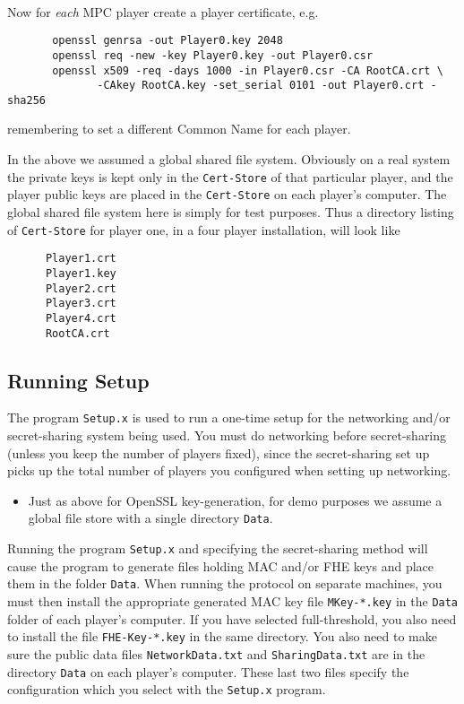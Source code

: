 ~~

\noindent
Now for {\em each} MPC player create a player certificate, e.g.
\begin{verbatim}
       openssl genrsa -out Player0.key 2048
       openssl req -new -key Player0.key -out Player0.csr
       openssl x509 -req -days 1000 -in Player0.csr -CA RootCA.crt \
              -CAkey RootCA.key -set_serial 0101 -out Player0.crt -sha256
\end{verbatim}
remembering to set a different Common Name for each player.

In the above we assumed a global shared file system.  Obviously on
a real system the private keys is kept only in the
\verb+Cert-Store+ of that particular player, and the player public
keys are placed in the \verb+Cert-Store+ on each player's
computer. The global shared file system here is simply for test
purposes. Thus a directory listing of \verb+Cert-Store+
for player one, in a four player installation, will look like
\begin{verbatim}
      Player1.crt
      Player1.key
      Player2.crt
      Player3.crt
      Player4.crt
      RootCA.crt
\end{verbatim}


\subsection{Running Setup}
The program \verb+Setup.x+ is used to run a one-time setup 
for the networking and/or secret-sharing system being used.
You must do networking before secret-sharing (unless you keep
the number of players fixed), since the secret-sharing set up
picks up the total number of players you configured when setting
up networking.
\begin{itemize}
\item Just as above for OpenSSL key-generation, for demo purposes we assume
a global file store with a single directory \verb+Data+.
\end{itemize}
Running the program \verb+Setup.x+ and specifying the secret-sharing
method will cause the program to generate files holding MAC and/or FHE
keys and place them in the folder \verb+Data+.  When running the
protocol on separate machines, you must then install the appropriate
generated MAC key file \verb+MKey-*.key+ in the \verb+Data+ folder of
each player's computer.  If you have selected full-threshold, you also
need to install the file \verb+FHE-Key-*.key+ in the same directory.
You also need to make sure the public data files
\verb+NetworkData.txt+ and \verb+SharingData.txt+ are in the directory
\verb+Data+ on each player's computer.
These last two files specify the configuration which you select with
the \verb+Setup.x+ program.

